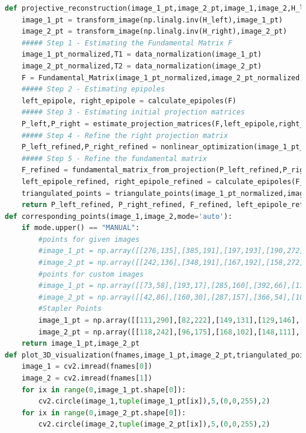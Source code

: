 \documentclass{article}
\begin{document}
\begin{lstlisting}[language=Python]
def projective_reconstruction(image_1_pt,image_2_pt,image_1,image_2,H_left,H_right,fnames,names):
	image_1_pt = transform_image(np.linalg.inv(H_left),image_1_pt)
	image_2_pt = transform_image(np.linalg.inv(H_right),image_2_pt)
	##### Step 1 - Estimating the Fundamental Matrix F
	image_1_pt_normalized,T1 = data_normalization(image_1_pt)
	image_2_pt_normalized,T2 = data_normalization(image_2_pt)
	F = Fundamental_Matrix(image_1_pt_normalized,image_2_pt_normalized,T1,T2)
	##### Step 2 - Estimating epipoles
	left_epipole, right_epipole = calculate_epipoles(F)
	##### Step 3 - Estimating initial projection matrices
	P_left,P_right = estimate_projection_matrices(F,left_epipole,right_epipole)
	##### Step 4 - Refine the right projection matrix
	P_left_refined,P_right_refined = nonlinear_optimization(image_1_pt_normalized,image_2_pt_normalized,P_left,P_right)
	##### Step 5 - Refine the fundamental matrix
	F_refined = fundamental_matrix_from_projection(P_left_refined,P_right_refined)
	left_epipole_refined, right_epipole_refined = calculate_epipoles(F_refined)
	triangulated_points = triangulate_points(image_1_pt_normalized,image_2_pt_normalized,P_left_refined,P_right_refined)
	return P_left_refined, P_right_refined, F_refined, left_epipole_refined, right_epipole_refined, triangulated_points
def corresponding_points(image_1,image_2,mode='auto'):
	if mode.upper() == "MANUAL":
		#points for given images
		#image_1_pt = np.array([[276,135],[385,191],[197,193],[190,272],[367,43],[447,130],[64,318],[275,341]])
		#image_2_pt = np.array([[242,136],[348,191],[167,192],[158,272],[345,44],[416,130],[31,318],[242,341]])
		#points for custom images
		#image_1_pt = np.array([[73,58],[193,17],[285,160],[392,66],[118,224],[267,356],[354,246],[371,135]])
		#image_2_pt = np.array([[42,86],[160,30],[287,157],[366,54],[107,252],[281,358],[348,231],[360,122]])
		#Stapler Points
		image_1_pt = np.array([[111,290],[82,222],[149,131],[129,146],[112,165],[357,359],[397,336],[401,301],[308,286],[354,267],[368,248],[372,239],[353,212],[385,173],[395,152],[386,120],[170,255]])
		image_2_pt = np.array([[118,242],[96,175],[168,102],[148,111],[126,126],[319,338],[367,324],[384,295],[290,268],[319,250],[344,234],[355,225],[320,189],[357,156],[377,139],[369,103],[165,215]])
	return image_1_pt,image_2_pt
def plot_3D_visualization(fnames,image_1_pt,image_2_pt,triangulated_points,names):
	image_1 = cv2.imread(fnames[0])
	image_2 = cv2.imread(fnames[1])
	for ix in range(0,image_1_pt.shape[0]):
		cv2.circle(image_1,tuple(image_1_pt[ix]),5,(0,0,255),2)
	for ix in range(0,image_2_pt.shape[0]):
		cv2.circle(image_2,tuple(image_2_pt[ix]),5,(0,0,255),2)


\end{lstlisting}
\end{document}
